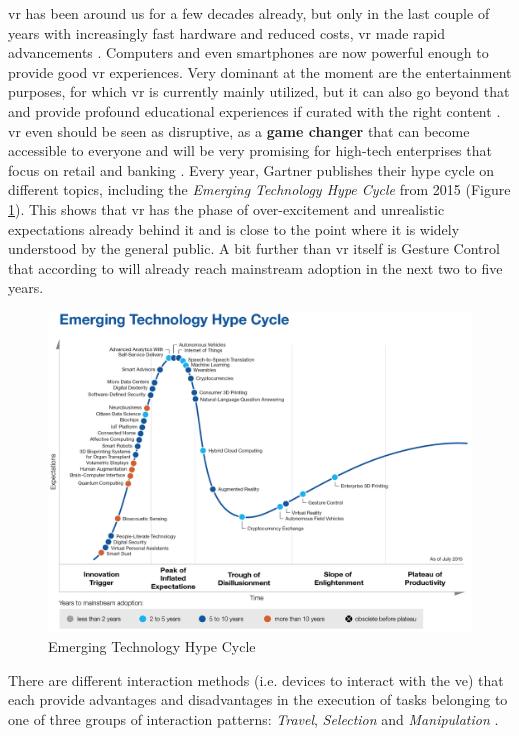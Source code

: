\gls{vr} has been around us for a few decades already, but only in the last couple of years with increasingly fast hardware and reduced costs, \gls{vr} made rapid advancements \citep{vrs2015}. Computers and even smartphones are now powerful enough to provide good \gls{vr} experiences. Very dominant at the moment are the entertainment purposes, for which \gls{vr} is currently mainly utilized, but it can also go beyond that and provide profound educational experiences if curated with the right content \citep{Safrudin2015}. \gls{vr} even should be seen as disruptive, as a \textbf{game changer} that can become accessible to everyone and will be very promising for high-tech enterprises that focus on retail and banking \citep{Safrudin2015}. \newline
Every year, Gartner publishes their hype cycle on different topics, including the \textit{Emerging Technology Hype Cycle} from 2015 (Figure \ref{fig:hypecycle}). This shows that \gls{vr} has the phase of over-excitement and unrealistic expectations already behind it and is close to the point where it is widely understood by the general public. A bit further than \gls{vr} itself is Gesture Control that according to \cite{Gartner2015} will already reach mainstream adoption in the next two to five years.
\begin{figure}[h]
	\begin{center}
		\includegraphics[width=14cm]{03_Figures/03_Gartner/Gartner_EmergingTech2015.png}
		\caption[Emerging Technology Hype Cycle]{Emerging Technology Hype Cycle \citep{Gartner2015b}}
		\label{fig:hypecycle}
	\end{center}
\end{figure} \newline
There are different interaction methods (i.e. devices to interact with the \gls{ve}) that each provide advantages and disadvantages in the execution of tasks belonging to one of three groups of interaction patterns: \textit{Travel}, \textit{Selection} and \textit{Manipulation} \citep{Bowman2002}. 


